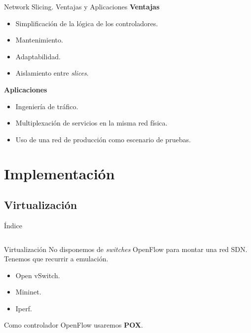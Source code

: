 \documentclass{beamer}
\begin{document}
\begin{frame}{Network Slicing. Ventajas y Aplicaciones}
    \textbf{Ventajas}
    \begin{itemize}
        \item Simplificación de la lógica de los controladores.
        \item Mantenimiento.
        \item Adaptabilidad.
        \item Aislamiento entre \textit{slices}.
    \end{itemize}
    \vspace{20pt}
    \textbf{Aplicaciones}
    \begin{itemize}
        \item Ingeniería de tráfico.
        \item Multiplexación de servicios en la misma red física.
        \item Uso de una red de producción como escenario de pruebas.
    \end{itemize}
\end{frame}

\section{Implementación}
\subsection{Virtualización}
\begin{frame}{Índice}
    \begin{columns}[t]
        \begin{column}{1.7in}
            \tableofcontents[currentsection, subsectionstyle=show/shaded/hide, sections={1-4}]
        \end{column}
        \begin{column}{1.7in}
            \tableofcontents[currentsection, subsectionstyle=show/shaded/hide, sections={5-7}]
        \end{column}
    \end{columns}
\end{frame}

\begin{frame}{Virtualización}
   No disponemos de \textit{switches} OpenFlow para montar una red SDN. Tenemos que recurrir a emulación.\vspace{10pt}
   \begin{itemize}
       \item Open vSwitch.
       \item Mininet.
       \item Iperf.
   \end{itemize}\vspace{10pt}
   
    Como controlador OpenFlow usaremos \textbf{POX}.
\end{frame}
\end{document}
